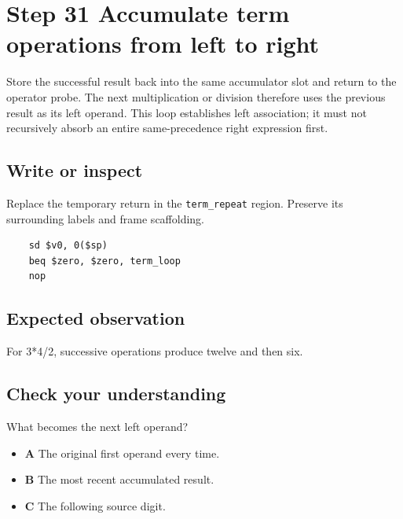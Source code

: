 \section{Step 31 Accumulate term operations from left to right}\label{expression-s31}

Store the successful result back into the same accumulator slot and return to the operator probe. The next multiplication or division therefore uses the previous result as its left operand. This loop establishes left association; it must not recursively absorb an entire same-precedence right expression first.

\subsection{Write or inspect}
Replace the temporary return in the \texttt{term\_repeat} region. Preserve its surrounding labels and frame scaffolding.

\begin{verbatim}
    sd $v0, 0($sp)
    beq $zero, $zero, term_loop
    nop
\end{verbatim}
\subsection{Expected observation}
For 3*4/2, successive operations produce twelve and then six.

\subsection{Check your understanding}
What becomes the next left operand?

\begin{itemize}
  \item \textbf{A} The original first operand every time.
  \item \textbf{B} The most recent accumulated result.
  \item \textbf{C} The following source digit.
\end{itemize}
